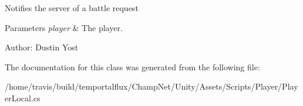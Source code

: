 Notifies the server of a battle request 


\begin{DoxyParams}{Parameters}
{\em player} & The player.\\
\hline
\end{DoxyParams}


Author\-: Dustin Yost 

The documentation for this class was generated from the following file\-:\begin{DoxyCompactItemize}
\item 
/home/travis/build/temportalflux/\-Champ\-Net/\-Unity/\-Assets/\-Scripts/\-Player/Player\-Local.\-cs\end{DoxyCompactItemize}
